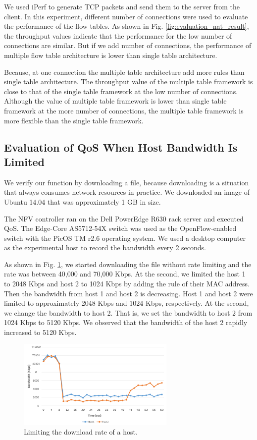 \documentclass[conference]{IEEEtran}
\begin{document}
We used iPerf to generate TCP packets and send them to the server from the client.
In this experiment, different number of connections were used to evaluate the performance of the flow tables.
As shown in Fig. \ref{fig:evaluation_nat_result}, the throughput values indicate that the performance for the low number of connections are similar.
But if we add number of connections, the performance of multiple flow table architecture is lower than single table architecture.

Because, at one connection the multiple table architecture add more rules than single table architecture.
The throughput value of the multiple table framework is close to that of the single table framework at the low number of connections.
Although the value of multiple table framework is lower than single table framework at the more number of connections, the multiple table framework is more flexible than the single table framework.

\subsection{Evaluation of QoS When Host Bandwidth Is Limited}

We verify our function by downloading a file, because downloading is a situation that always consumes network resources in practice.
We downloaded an image of Ubuntu 14.04 that was approximately 1 GB in size.

The NFV controller ran on the Dell PowerEdge R630 rack server and executed QoS.
The Edge-Core AS5712-54X \cite{edge-core-switch} switch was used as the OpenFlow-enabled switch with the PicOS TM r2.6 operating system.
We used a desktop computer as the experimental host to record the bandwidth every 2 seconds.

As shown in Fig. \ref{fig:qos_limit_host}, we started downloading the file without rate limiting and the rate was between 40,000 and 70,000 Kbps.
At the  second, we limited the host 1 to 2048 Kbps and host 2 to 1024 Kbps by adding the rule of their MAC address.
Then the bandwidth from host 1 and host 2 is decreasing. Host 1 and host 2 were limited to approximately 2048 Kbps and 1024 Kbps, respectively.
At the  second, we change the bandwidth to host 2. That is, we set the bandwidth to host 2 from 1024 Kbps to 5120 Kbps.
We observed that the bandwidth of the host 2 rapidly increased to 5120 Kbps.

\begin{figure}[!t]
\centering
\includegraphics[width=3in]{./figures/qos_limit_host}
\caption{Limiting the download rate of a host.}
\label{fig:qos_limit_host}
\end{figure}
\end{document}
